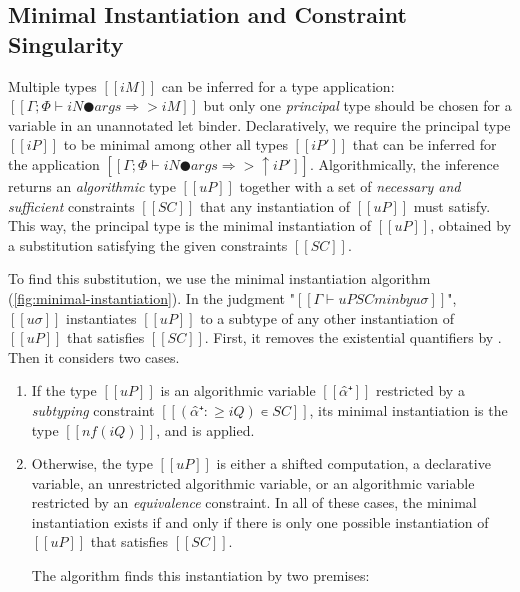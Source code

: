 \subsection{Minimal Instantiation and Constraint Singularity}
\label{sec:constraint-singularity}

Multiple types $[[iM]]$ can be inferred for a type application:
$[[Γ ; Φ ⊢ iN ● args ⇒> iM]]$ but only one \emph{principal} 
type should be chosen for a variable in an unannotated let binder.
Declaratively, we require the principal type $[[iP]]$ to be
minimal among other all types $[[iP']]$ that can be inferred
for the application $[[Γ ; Φ ⊢ iN ● args ⇒> ↑iP']]$.
Algorithmically, the inference returns an
\emph{algorithmic} type $[[uP]]$ 
together with a set of \emph{necessary and sufficient} 
constraints $[[SC]]$ that any instantiation of $[[uP]]$ must satisfy.
This way, the principal type is the minimal instantiation of $[[uP]]$,
obtained by a substitution satisfying the given constraints $[[SC]]$. 

To find this substitution, we use the minimal instantiation
algorithm (\cref{fig:minimal-instantiation}). In the judgment "$[[Γ ⊢ uP SC minby uσ]]$",
$[[uσ]]$ instantiates $[[uP]]$ to a subtype of any other 
instantiation of $[[uP]]$ that satisfies $[[SC]]$. 
First, it removes the existential quantifiers by .
Then it considers two cases. 
\begin{enumerate}
  \item If the type $[[uP]]$ is an algorithmic variable $[[α̂⁺]]$
    restricted by a \emph{subtyping} constraint $[[(α̂⁺ :≥ iQ) ∊ SC]]$,
    its minimal instantiation is the type $[[nf(iQ)]]$, and 
     is applied.
  \item Otherwise, the type $[[uP]]$ is either a shifted computation, a
    declarative variable, an unrestricted algorithmic variable, or an
    algorithmic variable restricted by an \emph{equivalence} constraint. In all
    of these cases, the minimal instantiation exists if and only if there is
    only one possible instantiation of $[[uP]]$ that satisfies $[[SC]]$.
    
    The algorithm finds this instantiation by two premises:
  \end{enumerate}


